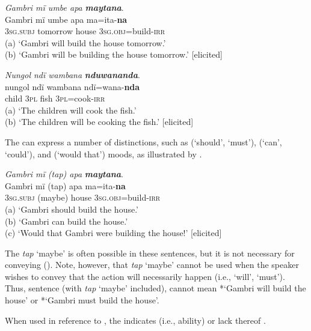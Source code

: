 \ea%
    \label{ex:verbs:33}
          \textit{Gambri mï umbe apa} \textbf{\textit{maytana}}.\\
\gll Gambri  mï      umbe    apa  ma=ita-\textbf{na}\\
    [name]    \textsc{3sg.subj}  tomorrow  house  \textsc{3sg.obj=}build-\textsc{irr}\\
\glt    (a) ‘Gambri will build the house tomorrow.’\\
    (b) ‘Gambri will be building the house tomorrow.’ [elicited]
\z

\ea%
    \label{ex:verbs:34}
          \textit{Nungol ndï wambana} \textbf{\textit{nduwananda}}.\\
\gll nungol  ndï  wambana  ndï=wana-\textbf{nda}\\
    child  \textsc{3pl}  fish    3\textsc{pl}=cook-\textsc{irr}\\
\glt    (a) ‘The children will cook the fish.’\\
    (b) ‘The children will be cooking the fish.’ [elicited]
\z

The   can express a number of  distinctions, such as  (‘should’, ‘must’),  (‘can’, ‘could’), and  (‘would that’) moods, as illustrated by .

\ea%
    \label{ex:verbs:35}
          \textit{Gambri mï (tap) apa} \textbf{\textit{maytana}}.\\
\gll Gambri  mï      (tap)    apa  ma=ita-\textbf{na}\\
    [name]    \textsc{3sg.subj}  (maybe)  house  \textsc{3sg.obj=}build-\textsc{irr}\\
\glt    (a) ‘Gambri should build the house.’\\
    (b) ‘Gambri can build the house.’\\
    (c) ‘Would that Gambri were building the house!’ [elicited]
\z

The  \textit{tap} ‘maybe’ is often possible in these sentences, but it is not necessary for conveying   (). Note, however, that \textit{tap} ‘maybe’ cannot be used when the speaker wishes to convey that the action will necessarily happen (i.e., ‘will’, ‘must’). Thus, sentence  (with \textit{tap} ‘maybe’ included), cannot mean *‘Gambri will build the house’ or *‘Gambri must build the house’.

  When used in reference to  , the   indicates  (i.e., ability) or lack thereof .

